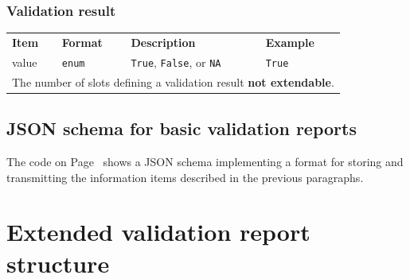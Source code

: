 \documentclass[a4paper, 11pt]{article}
\newcommand{\code}[1]{\texttt{#1}}
\newcommand{\waar}{{\normalfont \texttt{True}}}
\newcommand{\onwaar}{{\normalfont \texttt{False}}}
\newcommand{\na}{{\normalfont \texttt{NA}}}
\begin{document}
\subsubsection{Validation result}

\begin{center}
\begin{tabular}{|lp{15mm}p{}p{}|}
\hline
\textbf{Item} & \textbf{Format} & \textbf{Description} &\textbf{Example}\\
value  & \code{enum} & \waar{}, \onwaar{}, or \na{}    &\waar{}\\
\hline
\multicolumn{4}{|l|}{The number of slots defining a validation result \textbf{not extendable}.
}\\
\hline
\end{tabular}
\end{center}

\subsection{JSON schema for basic validation reports}
The code on Page~\pageref{code:basicreport} shows a JSON schema implementing
a format for storing and transmitting the information items described in the previous
paragraphs. 

\newpage
\label{code:basicreport}



\section{Extended validation report structure}




\end{document}
